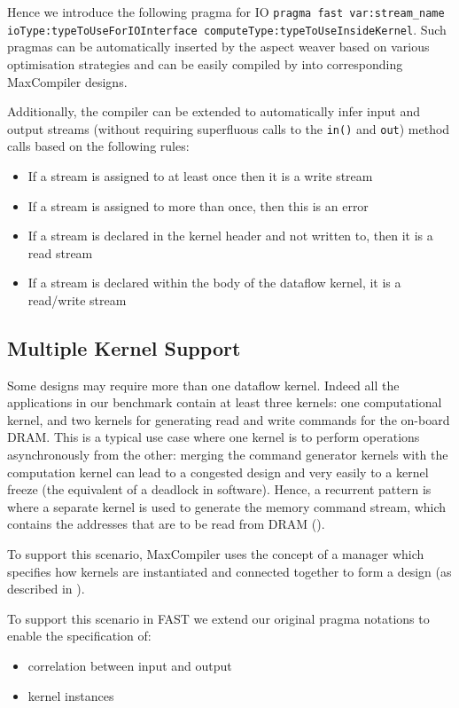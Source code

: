 Hence we introduce the following pragma for IO \texttt{pragma fast
  var:stream\_name ioType:typeToUseForIOInterface
  computeType:typeToUseInsideKernel}. Such pragmas can be
automatically inserted by the aspect weaver based on various
optimisation strategies and can be easily compiled by \fastc{} into
corresponding MaxCompiler designs.

Additionally, the \fastc{} compiler can be extended to automatically
infer input and output streams (without requiring superfluous calls to
the \texttt{in()} and \texttt{out}) method calls based on the following rules:
\begin{itemize}
\item If a stream is assigned to at least once then it is a write stream
\item If a stream is assigned to more than once, then this is an error
\item If a stream is declared in the kernel header and not written
  to, then it is a read stream
\item If a stream is declared within the body of the dataflow
  kernel, it is a read/write stream
\end{itemize}

\subsection{Multiple Kernel Support}

Some designs may require more than one dataflow kernel. Indeed all the
applications in our benchmark contain at least three kernels: one
computational kernel, and two kernels for generating read and write
commands for the on-board DRAM. This is a typical use case where one
kernel is to perform operations asynchronously from the other: merging
the command generator kernels with the computation kernel can lead to
a congested design and very easily to a kernel freeze (the equivalent
of a deadlock in software). Hence, a recurrent pattern is where a
separate kernel is used to generate the memory command stream, which
contains the addresses that are to be read from DRAM
().

To support this scenario, MaxCompiler uses the concept of a manager
which specifies how kernels are instantiated and connected together to
form a design (as described in ).

To support this scenario in FAST we extend our original pragma
notations to enable the specification of:
\begin{itemize}
\item correlation between input and output
\item kernel instances
\end{itemize}

